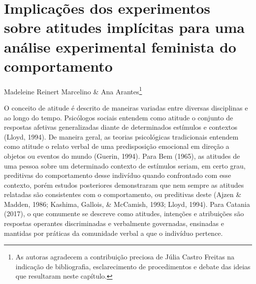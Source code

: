 \setcounter{footnote}{0}
\setcounter{figure}{0}
\setcounter{table}{0}
\chapter*{Implicações dos experimentos sobre atitudes implícitas para uma análise experimental feminista do comportamento}
\begin{flushright}
\begin{small}
    Madeleine Reinert Marcelino \& Ana Arantes\footnote{As autoras agradecem a contribuição preciosa de Júlia Castro Freitas na indicação de bibliografia, esclarecimento de procedimentos e debate das ideias que resultaram neste capítulo.}
\end{small}
\vspace{1cm}
\end{flushright}

O conceito de atitude é descrito de maneiras variadas entre diversas disciplinas e ao longo do tempo. Psicólogos sociais entendem como atitude o conjunto de respostas afetivas generalizadas diante de determinados estímulos e contextos (Lloyd, 1994). De maneira geral, as teorias psicológicas tradicionais entendem como atitude o relato verbal de uma predisposição emocional em direção a objetos ou eventos do mundo (Guerin, 1994). Para Bem (1965), as atitudes de uma pessoa sobre um determinado contexto de estímulos seriam, em certo grau, preditivas do comportamento desse indivíduo quando confrontado com esse contexto, porém estudos posteriores demonstraram que nem sempre as atitudes relatadas são consistentes com o comportamento, ou preditivas deste (Ajzen \& Madden, 1986; Kashima, Gallois, \& McCamish, 1993; Lloyd, 1994). Para Catania (2017), o que comumente se descreve como atitudes, intenções e atribuições são respostas operantes discriminadas e verbalmente governadas, ensinadas e mantidas por práticas da comunidade verbal a que o indivíduo pertence.

